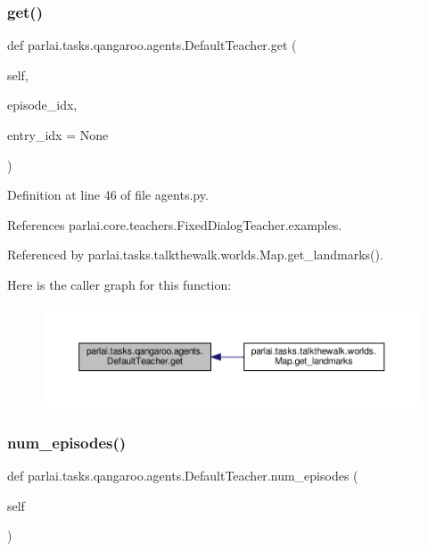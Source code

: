 \subsubsection{\texorpdfstring{get()}{get()}}
{\footnotesize\ttfamily def parlai.\+tasks.\+qangaroo.\+agents.\+Default\+Teacher.\+get (\begin{DoxyParamCaption}\item[{}]{self,  }\item[{}]{episode\+\_\+idx,  }\item[{}]{entry\+\_\+idx = {\ttfamily None} }\end{DoxyParamCaption})}



Definition at line 46 of file agents.\+py.



References parlai.\+core.\+teachers.\+Fixed\+Dialog\+Teacher.\+examples.



Referenced by parlai.\+tasks.\+talkthewalk.\+worlds.\+Map.\+get\+\_\+landmarks().

Here is the caller graph for this function\+:
\nopagebreak
\begin{figure}[H]
\begin{center}
\leavevmode
\includegraphics[width=350pt]{classparlai_1_1tasks_1_1qangaroo_1_1agents_1_1DefaultTeacher_a02b79b33e67868bc575b65e26de38d51_icgraph}
\end{center}
\end{figure}
\mbox{\label{classparlai_1_1tasks_1_1qangaroo_1_1agents_1_1DefaultTeacher_a467ada61caf807815a88abfd6e742799}} 
\subsubsection{\texorpdfstring{num\+\_\+episodes()}{num\_episodes()}}
{\footnotesize\ttfamily def parlai.\+tasks.\+qangaroo.\+agents.\+Default\+Teacher.\+num\+\_\+episodes (\begin{DoxyParamCaption}\item[{}]{self }\end{DoxyParamCaption})}



